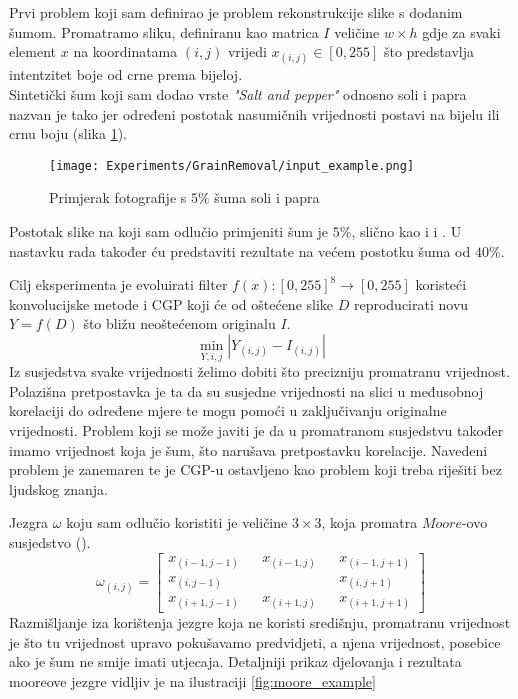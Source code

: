 Prvi problem koji sam definirao je problem rekonstrukcije slike s dodanim šumom.
Promatramo sliku, definiranu kao matrica $I$ veličine $w \times h$ gdje za svaki element $x$ na koordinatama $(i, j)$ vrijedi $x_{(i, j)} \in [0, 255]$ što predstavlja intentzitet boje od crne prema bijeloj. \\
Sintetički šum koji sam dodao vrste \emph{"Salt and pepper"} odnosno soli i papra nazvan je tako jer određeni postotak nasumičnih vrijednosti postavi na bijelu ili crnu boju (slika \ref{fig:salt_pepper_example}).

\begin{figure}
	\centering
	\texttt{[image: Experiments/GrainRemoval/input\_example.png]}
	\caption{Primjerak fotografije s $5\%$ šuma soli i papra}
	\label{fig:salt_pepper_example}
\end{figure}

Postotak slike na koji sam odlučio primjeniti šum je $5\%$, slično kao i \cite{cgp_image_processing} i \cite{Sekanina2011}.
U nastavku rada također ću predstaviti rezultate na većem postotku šuma od $40\%$.

Cilj eksperimenta je evoluirati filter $f(x): [0, 255]^8 \rightarrow [0, 255]$ koristeći konvolucijske metode i CGP koji će od oštećene slike $D$ reproducirati novu $Y = f(D)$ što bližu neoštećenom originalu $I$.
$$
\min_{Y, i, j} |Y_{(i, j)} - I_{(i, j)}|
$$
Iz susjedstva svake vrijednosti želimo dobiti što precizniju promatranu vrijednost. \\
Polazišna pretpostavka je ta da su susjedne vrijednosti na slici u međusobnoj korelaciji do određene mjere te mogu pomoći u zaključivanju originalne vrijednosti.
Problem koji se može javiti je da u promatranom susjedstvu također imamo vrijednost koja je šum, što narušava pretpostavku korelacije.
Navedeni problem je zanemaren te je CGP-u ostavljeno kao problem koji treba riješiti bez ljudskog znanja.

Jezgra $\omega$ koju sam odlučio koristiti je veličine $3 \times 3$, koja promatra $Moore$-ovo susjedstvo (\cite{jakobovic}).
\[
	\omega_{(i, j)}
	=
	\begin{bmatrix}
		x_{(i - 1, j - 1)} && x_{(i - 1, j)} && x_{(i - 1, j + 1)}\\
		x_{(i, j - 1)} && && x_{(i, j + 1)}\\
		x_{(i + 1, j - 1)} && x_{(i + 1, j)} && x_{(i + 1, j + 1)}
	\end{bmatrix}
\]
Razmišljanje iza korištenja jezgre koja ne koristi središnju, promatranu vrijednost je što tu vrijednost upravo pokušavamo predvidjeti, a njena vrijednost, posebice ako je šum ne smije imati utjecaja.
Detaljniji prikaz djelovanja i rezultata mooreove jezgre vidljiv je na ilustraciji \ref{fig:moore_example}

